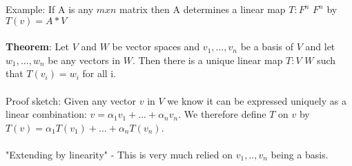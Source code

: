\documentclass{article}
\begin{document}
Example: If A is any $m x n$ matrix then A determines a linear map $T: F^n$ \textrightarrow $F^n$ by $T(v) = A*V$\\\\
\textbf{Theorem}: Let $V$ and $W$ be vector spaces and $v_1, ..., v_n$ be a basis of $V$ and let $w_1, ..., w_n$ be any vectors in $W$. Then there is a unique linear map $T: V$ \textrightarrow $W$ such that $T(v_i) = w_i$ for all i. \\ \\ 

Proof sketch: Given any vector $v$ in $V$ we know it can be expressed uniquely as a linear combination: $v = \alpha_1v_1 + ... + \alpha_nv_n$. We therefore define $T$ on $v$ by $T(v) = \alpha_1T(v_1) + ... + \alpha_nT(v_n)$. \\\\
"Extending by linearity" - This is very much relied on $v_1, .., v_n$ being a basis. \\
\end{document}
